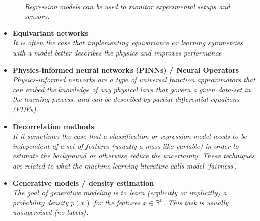\documentclass[12pt,letterpaper]{article}
\begin{document}
\begin{itemize}
\begin{itemize}
		\\\textit{Regression models can be used to monitor experimental setups and sensors.}
	\end{itemize}
\item \textbf{Equivariant networks}~\cite{CMS:2025dpp,Spinner:2025prg,Sanz:2025sld,Nabat:2024nce,Woodward:2024dxb,Brehmer:2024yqw,Maitre:2024hzp,Hendi:2024yin,Cruz:2024grk,Spinner:2024hjm,Bhardwaj:2024wrf,Sahu:2024sts,Bhardwaj:2024djv,Chatterjee:2024pbp,Bressler:2024wzc,Gu:2024lrz,Bright-Thonney:2023gdl,Bogatskiy:2023nnw,Murnane:2023kfm,Lehner:2023prf,Forestano:2023qcy,Buhmann:2023pmh,Aronsson:2023rli,Forestano:2023fpj,Lehner:2023bba,Hao:2022zns,Bogatskiy:2022czk,Favoni:2022mcg,Bogatskiy:2022hub,Shi:2022yqw,Gong:2022lye,Bulusu:2021njs,Favoni:2020reg,Dolan:2020qkr,Kanwar:2003.06413}
\\\textit{It is often the case that implementing equivariance or learning symmetries with a model better describes the physics and improves performance}
\item \textbf{Physics-informed neural networks (PINNs) / Neural Operators}~\cite{Stewart:2025vua,Kou:2025qsg,Bento:2025agw,Hashimoto:2024mdi,Terin:2024iyy,Vatellis:2024vjl,Panahi:2024sfb,Lin:2024eiz,Mizera:2023bsw}
\\\textit{Physics-informed networks are a type of universal function approximators that can embed the knowledge of any physical laws that govern a given data-set in the learning process, and can be described by partial differential equations (PDEs).}
\item \textbf{Decorrelation methods}~\cite{ClarkeHall:2025oiz,CMS:2025bxo,CMS:2025cvw,Oleksiyuk:2025pmu,Rothen:2024vro,Algren:2023spv,Rabusov:2022woa,Das:2022cjl,Klein:2022hdv,Mikuni:2021nwn,Dolan:2021pml,Ghosh:2021hrh,Kitouni:2020xgb,Kasieczka:2020pil,clavijo2020adversarial,10.1088/2632-2153/ab9023,Rogozhnikov:2014zea,Wunsch:2019qbo,Englert:2018cfo,Xia:2018kgd,DiscoFever,ATL-PHYS-PUB-2018-014,Bradshaw:2019ipy,Shimmin:2017mfk,Stevens:2013dya,Moult:2017okx,Dolen:2016kst,Louppe:2016ylz}
\\\textit{It it sometimes the case that a classification or regression model needs to be independent of a set of features (usually a mass-like variable) in order to estimate the background or otherwise reduce the uncertainty.  These techniques are related to what the machine learning literature calls model `fairness'.}
\item \textbf{Generative models / density estimation}
\\\textit{The goal of generative modeling is to learn (explicitly or implicitly) a probability density $p(x)$ for the features $x\in\mathbb{R}^n$.  This task is usually unsupervised (no labels).}

\end{itemize}
\end{document}
